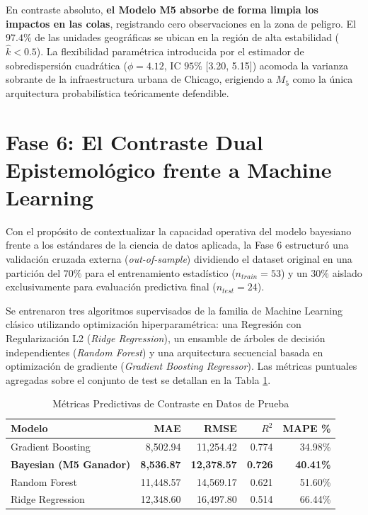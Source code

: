 \documentclass[11pt,a4paper]{article}
\begin{document}
En contraste absoluto, \textbf{el Modelo M5 absorbe de forma limpia los impactos en las colas}, registrando cero observaciones en la zona de peligro. El $97.4\%$ de las unidades geográficas se ubican en la región de alta estabilidad ($\hat{k} < 0.5$). La flexibilidad paramétrica introducida por el estimador de sobredispersión cuadrática ($\phi = 4.12$, IC $95\%$ [3.20, 5.15]) acomoda la varianza sobrante de la infraestructura urbana de Chicago, erigiendo a $M_5$ como la única arquitectura probabilística teóricamente defendible.

\section{Fase 6: El Contraste Dual Epistemológico frente a Machine Learning}
Con el propósito de contextualizar la capacidad operativa del modelo bayesiano frente a los estándares de la ciencia de datos aplicada, la Fase 6 estructuró una validación cruzada externa (\textit{out-of-sample}) dividiendo el dataset original en una partición del $70\%$ para el entrenamiento estadístico ($n_{train} = 53$) y un $30\%$ aislado exclusivamente para evaluación predictiva final ($n_{test} = 24$).

Se entrenaron tres algoritmos supervisados de la familia de Machine Learning clásico utilizando optimización hiperparamétrica: una Regresión con Regularización L2 (\textit{Ridge Regression}), un ensamble de árboles de decisión independientes (\textit{Random Forest}) y una arquitectura secuencial basada en optimización de gradiente (\textit{Gradient Boosting Regressor}). Las métricas puntuales agregadas sobre el conjunto de test se detallan en la Tabla \ref{tab:ml_completa}.

\begin{table}[!ht]
\centering
\caption{Métricas Predictivas de Contraste en Datos de Prueba}
\label{tab:ml_completa}
\begin{tabular}{lrrrr}
\toprule
\textbf{Modelo} & \textbf{MAE} & \textbf{RMSE} & \textbf{$R^2$} & \textbf{MAPE \%} \\
\midrule
Gradient Boosting & 8{,}502.94 & 11{,}254.42 & 0.774 & 34.98\% \\
\textbf{Bayesian (M5 Ganador)} & \textbf{8{,}536.87} & \textbf{12{,}378.57} & \textbf{0.726} & \textbf{40.41\%} \\
Random Forest & 11{,}448.57 & 14{,}569.17 & 0.621 & 51.60\% \\
Ridge Regression & 12{,}348.60 & 16{,}497.80 & 0.514 & 66.44\% \\
\bottomrule
\end{tabular}
\end{table}
\end{document}
